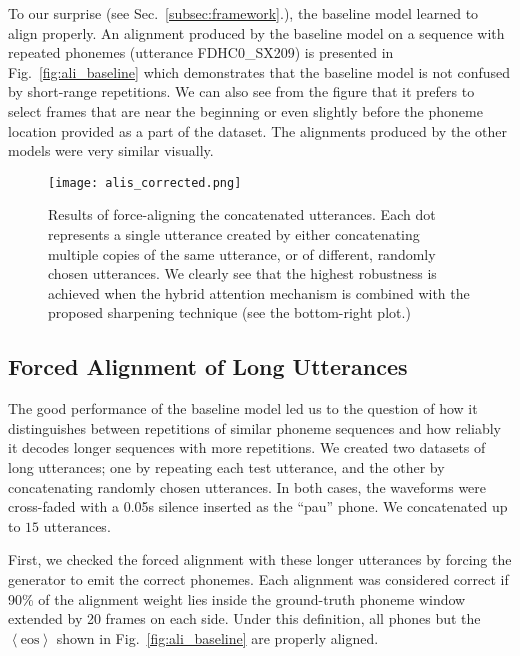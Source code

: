 \documentclass{article}
\begin{document}
To our surprise
(see Sec.~\ref{subsec:framework}.),  
the baseline model learned to align properly.
An alignment produced by the baseline model
on a sequence with repeated phonemes (utterance FDHC0\_SX209) is presented in
Fig.~\ref{fig:ali_baseline} which demonstrates that  the baseline model is not
confused by short-range repetitions. We can also see
from the figure that it
prefers to select frames that are near the beginning or even slightly before the
phoneme location provided as a part of the dataset. The alignments produced by
the other models were very similar visually.

\begin{figure}[t]
  \centering
  \vspace{.1cm} \texttt{[image: alis\_corrected.png]}
\caption[Results of force-aligning of long utterances with corrections.]{
    Results of force-aligning the concatenated utterances. Each dot
    represents a single utterance created by either concatenating
    multiple copies of the same utterance, or of different, randomly
    chosen utterances. 
We clearly see that the highest robustness is achieved
    when the hybrid attention mechanism is combined with the proposed sharpening
    technique (see the bottom-right plot.)
}
  \label{fig:forced_ali_corrected}

  \vspace{-4mm}
\end{figure}

\subsection{Forced Alignment of Long Utterances}

The good performance of the baseline model led us to the question of how it
distinguishes between repetitions of similar phoneme sequences and how reliably
it decodes longer sequences with more repetitions. We created two datasets of
long utterances; one by repeating each test utterance, and the other by
concatenating randomly chosen utterances. In both cases, the waveforms were
cross-faded with a 0.05s silence inserted as the ``pau'' phone. We concatenated
up to $15$ utterances.

First, we checked the forced alignment with these longer utterances by forcing
the generator to emit the correct phonemes. Each alignment was considered
correct if 90\% of the alignment weight lies inside the ground-truth phoneme
window extended by 20 frames on each side. Under this definition, all
phones but the
$\left<\text{eos}\right>$ shown in Fig.~\ref{fig:ali_baseline} are properly
aligned.
\end{document}
